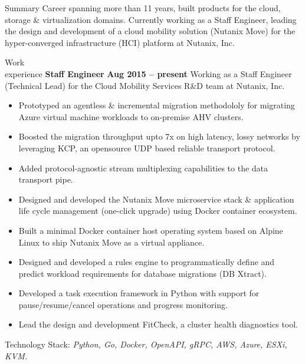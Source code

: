 \documentclass{resume}
\author{Sreejith Kesavan}
\begin{document}
\maketitle

\begin{category}{Summary}
  \citemnobullet Career spanning more than 11 years, built products for the cloud, storage \& virtualization domains. Currently working as a Staff Engineer, leading the design and development of a cloud mobility solution (Nutanix Move) for the hyper-converged infrastructure (HCI) platform at Nutanix, Inc.
\end{category}


\begin{category}{Work \\experience}
  \citemnobullet \textbf{Staff Engineer} \hfill \textbf{Aug 2015 -- present}
  \citemnobullet Working as a Staff Engineer (Technical Lead) for the Cloud Mobility Services R\&D team at Nutanix, Inc.
  \begin{itemize}
  \item Prototyped an agentless \& incremental migration methodololy for migrating Azure virtual machine workloads to on-premise AHV clusters.
  \item Boosted the migration throughput upto 7x on high latency, lossy networks by leveraging KCP, an opensource UDP based reliable transport protocol.
  \item Added protocol-agnostic stream multiplexing capabilities to the data transport pipe.
  \item Designed and developed the Nutanix Move microservice stack \& application life cycle management (one-click upgrade) using Docker container ecosystem.
  \item Built a minimal Docker container host operating system based on Alpine Linux to ship Nutanix Move as a virtual appliance.
  \item Designed and developed a rules engine to programmatically define and predict workload requirements for database migrations (DB Xtract).
  \item Developed a task execution framework in Python with support for pause/resume/cancel operations and progress monitoring.
  \item Lead the design and development FitCheck, a cluster health diagnostics tool.
  \end{itemize}
  \citemnobullet Technology Stack: \textit{Python, Go, Docker, OpenAPI, gRPC, AWS, Azure, ESXi, KVM.}



\end{category}
\end{document}
